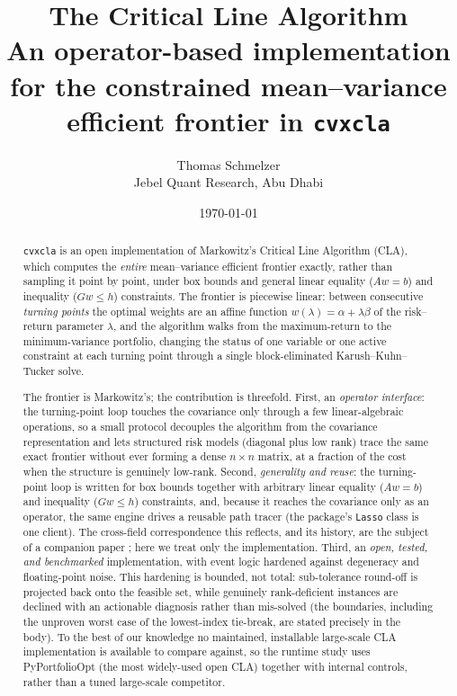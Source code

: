 \documentclass[11pt]{article}
\title{\textbf{The Critical Line Algorithm}\\[0.3em]
\large An operator-based implementation for the constrained mean--variance efficient
frontier in \texttt{cvxcla}}
\author{Thomas Schmelzer\\[2pt]
\normalsize Jebel Quant Research, Abu Dhabi}
\date{\today}
\begin{document}
\maketitle

\begin{abstract}
\texttt{cvxcla} is an open implementation of Markowitz's Critical Line Algorithm
(CLA), which computes the \emph{entire} mean--variance efficient frontier exactly,
rather than sampling it point by point, under box bounds and general linear equality
($A w = b$) and inequality ($G w \le h$) constraints. The frontier is piecewise
linear: between consecutive \emph{turning points} the optimal weights are an affine
function $w(\lambda) = \alpha + \lambda\beta$ of the risk--return parameter
$\lambda$, and the algorithm walks from the maximum-return to the minimum-variance
portfolio, changing the status of one variable or one active constraint at each
turning point through a single block-eliminated Karush--Kuhn--Tucker solve.

The frontier is Markowitz's; the contribution is threefold. First, an
\emph{operator interface}: the turning-point loop touches the covariance only
through a few linear-algebraic operations, so a small protocol decouples the
algorithm from the covariance representation and lets structured risk models
(diagonal plus low rank) trace the same exact frontier without ever forming a dense
$n\times n$ matrix, at a fraction of the cost when the structure is genuinely
low-rank. Second, \emph{generality and reuse}: the turning-point loop is written for
box bounds together with arbitrary linear equality ($Aw=b$) and inequality
($Gw\le h$) constraints, and, because it reaches the covariance only as an operator,
the same engine drives a reusable path tracer (the package's \texttt{Lasso} class is one
client). The cross-field correspondence this reflects, and its history, are the subject
of a companion paper \citep{schmelzer2026perspective}; here we treat only the
implementation. Third, an \emph{open, tested, and benchmarked} implementation, with event logic
hardened against degeneracy and floating-point noise. This hardening is bounded, not
total: sub-tolerance round-off is projected back onto the feasible set, while
genuinely rank-deficient instances are declined with an actionable diagnosis rather
than mis-solved (the boundaries, including the unproven worst case of the
lowest-index tie-break, are stated precisely in the body). To the best of our
knowledge no maintained, installable large-scale CLA implementation is available to
compare against, so the runtime study uses PyPortfolioOpt (the most widely-used open
CLA) together with internal controls, rather than a tuned large-scale competitor.
\end{abstract}
\end{document}
